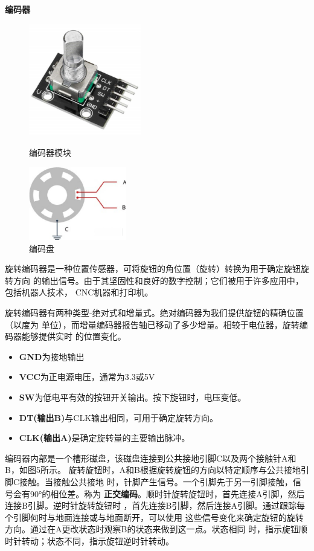 \documentclass[UTF8,14pt]{article}
\newcommand\sectiontwo[1]{\centerline{\large{\bfseries{#1}}}}
\begin{document}
\sectiontwo{编码器}
\begin{figure}%
	\vspace{-0.4cm}
	\centering
	\includegraphics[width=4.89cm]{figures/Ratary_Encoder.pdf}
	\vspace{-10pt}
	\caption{编码器模块}
	\includegraphics[width=4.25cm]{figures/mapan.pdf}
	\vspace{-5pt}
	\caption{编码盘}
	\vspace{-10pt}
\end{figure}
旋转编码器是一种位置传感器，可将旋钮的角位置（旋转）转换为用于确定旋钮旋转方向
的输出信号。由于其坚固性和良好的数字控制；它们被用于许多应用中，包括机器人技术，
CNC机器和打印机。

旋转编码器有两种类型-绝对式和增量式。绝对编码器为我们提供旋钮的精确位置（以度为
单位），而增量编码器报告轴已移动了多少增量。相较于电位器，旋转编码器能够提供实时
的位置变化。

\begin{itemize}
	\item \textbf{GND}为接地输出
	\item \textbf{VCC}为正电源电压，通常为3.3或5V
	\item \textbf{SW}为低电平有效的按钮开关输出。按下旋钮时，电压变低。
	\item \textbf{DT(输出B)}与CLK输出相同，可用于确定旋转方向。
	\item \textbf{CLK(输出A)}是确定旋转量的主要输出脉冲。
\end{itemize}

编码器内部是一个槽形磁盘，该磁盘连接到公共接地引脚C以及两个接触针A和B，如图5所示。
旋转旋钮时，A和B根据旋转旋钮的方向以特定顺序与公共接地引脚C接触。当接触公共接地
时，针脚产生信号。一个引脚先于另一引脚接触，信号会有90°的相位差。称为
\textbf{正交编码}。顺时针旋转旋钮时，首先连接A引脚，然后连接B引脚。逆时针旋转旋钮时
，首先连接B引脚，然后连接A引脚。通过跟踪每个引脚何时与地面连接或与地面断开，可以使用
这些信号变化来确定旋钮的旋转方向。通过在A更改状态时观察B的状态来做到这一点。状态相同
时，指示旋钮顺时针转动；状态不同，指示旋钮逆时针转动。
\end{document}
